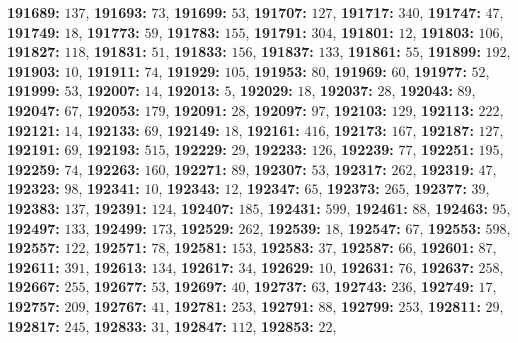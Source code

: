\textsf{\bfseries 191689:} $137$, \textsf{\bfseries 191693:} $73$, \textsf{\bfseries 191699:} $53$, \textsf{\bfseries 191707:} $127$, \textsf{\bfseries 191717:} $340$, \textsf{\bfseries 191747:} $47$, \textsf{\bfseries 191749:} $18$, \textsf{\bfseries 191773:} $59$, \textsf{\bfseries 191783:} $155$, \textsf{\bfseries 191791:} $304$, \textsf{\bfseries 191801:} $12$, \textsf{\bfseries 191803:} $106$, \textsf{\bfseries 191827:} $118$, \textsf{\bfseries 191831:} $51$, \textsf{\bfseries 191833:} $156$, \textsf{\bfseries 191837:} $133$, \textsf{\bfseries 191861:} $55$, \textsf{\bfseries 191899:} $192$, \textsf{\bfseries 191903:} $10$, \textsf{\bfseries 191911:} $74$, \textsf{\bfseries 191929:} $105$, \textsf{\bfseries 191953:} $80$, \textsf{\bfseries 191969:} $60$, \textsf{\bfseries 191977:} $52$, \textsf{\bfseries 191999:} $53$, \textsf{\bfseries 192007:} $14$, \textsf{\bfseries 192013:} $5$, \textsf{\bfseries 192029:} $18$, \textsf{\bfseries 192037:} $28$, \textsf{\bfseries 192043:} $89$, \textsf{\bfseries 192047:} $67$, \textsf{\bfseries 192053:} $179$, \textsf{\bfseries 192091:} $28$, \textsf{\bfseries 192097:} $97$, \textsf{\bfseries 192103:} $129$, \textsf{\bfseries 192113:} $222$, \textsf{\bfseries 192121:} $14$, \textsf{\bfseries 192133:} $69$, \textsf{\bfseries 192149:} $18$, \textsf{\bfseries 192161:} $416$, \textsf{\bfseries 192173:} $167$, \textsf{\bfseries 192187:} $127$, \textsf{\bfseries 192191:} $69$, \textsf{\bfseries 192193:} $515$, \textsf{\bfseries 192229:} $29$, \textsf{\bfseries 192233:} $126$, \textsf{\bfseries 192239:} $77$, \textsf{\bfseries 192251:} $195$, \textsf{\bfseries 192259:} $74$, \textsf{\bfseries 192263:} $160$, \textsf{\bfseries 192271:} $89$, \textsf{\bfseries 192307:} $53$, \textsf{\bfseries 192317:} $262$, \textsf{\bfseries 192319:} $47$, \textsf{\bfseries 192323:} $98$, \textsf{\bfseries 192341:} $10$, \textsf{\bfseries 192343:} $12$, \textsf{\bfseries 192347:} $65$, \textsf{\bfseries 192373:} $265$, \textsf{\bfseries 192377:} $39$, \textsf{\bfseries 192383:} $137$, \textsf{\bfseries 192391:} $124$, \textsf{\bfseries 192407:} $185$, \textsf{\bfseries 192431:} $599$, \textsf{\bfseries 192461:} $88$, \textsf{\bfseries 192463:} $95$, \textsf{\bfseries 192497:} $133$, \textsf{\bfseries 192499:} $173$, \textsf{\bfseries 192529:} $262$, \textsf{\bfseries 192539:} $18$, \textsf{\bfseries 192547:} $67$, \textsf{\bfseries 192553:} $598$, \textsf{\bfseries 192557:} $122$, \textsf{\bfseries 192571:} $78$, \textsf{\bfseries 192581:} $153$, \textsf{\bfseries 192583:} $37$, \textsf{\bfseries 192587:} $66$, \textsf{\bfseries 192601:} $87$, \textsf{\bfseries 192611:} $391$, \textsf{\bfseries 192613:} $134$, \textsf{\bfseries 192617:} $34$, \textsf{\bfseries 192629:} $10$, \textsf{\bfseries 192631:} $76$, \textsf{\bfseries 192637:} $258$, \textsf{\bfseries 192667:} $255$, \textsf{\bfseries 192677:} $53$, \textsf{\bfseries 192697:} $40$, \textsf{\bfseries 192737:} $63$, \textsf{\bfseries 192743:} $236$, \textsf{\bfseries 192749:} $17$, \textsf{\bfseries 192757:} $209$, \textsf{\bfseries 192767:} $41$, \textsf{\bfseries 192781:} $253$, \textsf{\bfseries 192791:} $88$, \textsf{\bfseries 192799:} $253$, \textsf{\bfseries 192811:} $29$, \textsf{\bfseries 192817:} $245$, \textsf{\bfseries 192833:} $31$, \textsf{\bfseries 192847:} $112$, \textsf{\bfseries 192853:} $22$, 
